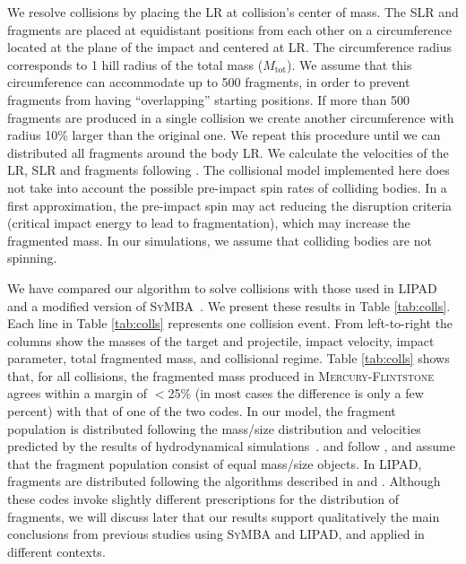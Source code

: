 \documentclass[fleqn,usenatbib]{mnras}
\begin{document}
We resolve collisions by placing the LR at collision's center of mass. The SLR and fragments are placed at equidistant positions from each other on a circumference located at the plane of the impact and centered at LR. The circumference radius corresponds to 1 hill radius of the total mass ($M_{\text{tot}}$). We assume that this circumference can accommodate up to 500 fragments, in order to prevent fragments from having ``overlapping'' starting positions. If more than 500 fragments are produced in a single collision we create another circumference with radius 10\% larger than the original one. We repeat this procedure until we can distributed all fragments around the body LR. We calculate the velocities of the LR, SLR and fragments following \cite{leinhardt2012}. The collisional model implemented here  does not take into account the possible pre-impact spin rates of colliding bodies. In a first approximation, the pre-impact spin may act reducing the disruption criteria (critical impact energy to lead to fragmentation), which may increase the fragmented mass. In our simulations, we assume that colliding bodies are not spinning.

We have compared our algorithm to solve collisions with those  used in   \textsc{LIPAD}~\citep{levisonetal12} and a modified version of \textsc{SyMBA}~\citep{duncanetal98,poon19,scoraetal2020}. We present these results in Table \ref{tab:colls}. Each line in Table \ref{tab:colls} represents one  collision event. From left-to-right  the columns show the masses of the target and projectile, impact velocity, impact parameter, total fragmented mass, and collisional regime. Table \ref{tab:colls}  shows that, for all collisions, the fragmented mass produced in \textsc{Mercury-Flintstone} agrees within a margin of $<$25\% (in most cases the difference is only a few percent) with that of one of the two codes. In our model, the fragment population is distributed following the mass/size distribution and velocities predicted by the results of hydrodynamical simulations~\citep{leinhardt2012}.  \cite{poon19} and \cite{scoraetal2020} follow \cite{chambers13}, and assume that the fragment population consist of equal mass/size objects. In \textsc{LIPAD}, fragments are distributed following the algorithms described in \cite{benzasphaug99} and \cite{morbidellietal09}. Although these codes invoke slightly different prescriptions for the distribution of fragments, we will discuss later that our results support qualitatively the main conclusions from previous studies using  \textsc{SyMBA} and \textsc{LIPAD}, and applied in different contexts.
\end{document}
